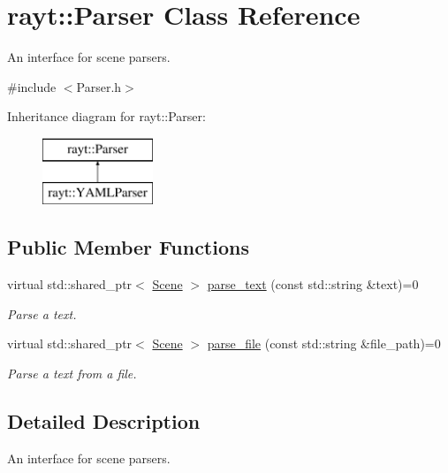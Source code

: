 \hypertarget{classrayt_1_1_parser}{}\section{rayt\+::Parser Class Reference}
\label{classrayt_1_1_parser}


An interface for scene parsers.  




{\ttfamily \#include $<$Parser.\+h$>$}

Inheritance diagram for rayt\+::Parser\+:\begin{figure}[H]
\begin{center}
\leavevmode
\includegraphics[height=2.000000cm]{classrayt_1_1_parser}
\end{center}
\end{figure}
\subsection*{Public Member Functions}
\begin{DoxyCompactItemize}
\item 
virtual std\+::shared\+\_\+ptr$<$ \mbox{\hyperlink{classrayt_1_1_scene}{Scene}} $>$ \mbox{\hyperlink{classrayt_1_1_parser_a70296f0148b00574553a519156806fef}{parse\+\_\+text}} (const std\+::string \&text)=0
\begin{DoxyCompactList}\small\item\em Parse a text. \end{DoxyCompactList}\item 
virtual std\+::shared\+\_\+ptr$<$ \mbox{\hyperlink{classrayt_1_1_scene}{Scene}} $>$ \mbox{\hyperlink{classrayt_1_1_parser_aa8ccda646d36c2c33013535947593def}{parse\+\_\+file}} (const std\+::string \&file\+\_\+path)=0
\begin{DoxyCompactList}\small\item\em Parse a text from a file. \end{DoxyCompactList}\end{DoxyCompactItemize}


\subsection{Detailed Description}
An interface for scene parsers. 

